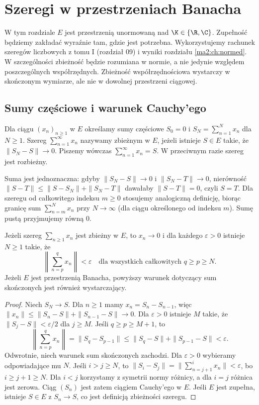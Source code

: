 \chapter{Szeregi w przestrzeniach Banacha}
\label{ma2:ch:banach-series}

W tym rozdziale $E$ jest przestrzenią unormowaną nad
$\K\in\{\R,\C\}$. Zupełność będziemy zakładać wyraźnie tam,
gdzie jest potrzebna. Wykorzystujemy rachunek szeregów liczbowych
z tomu I (rozdział 09) i wyniki rozdziału \ref{ma2:ch:normed}.
W szczególności zbieżność będzie rozumiana w normie, a nie
jedynie względem poszczególnych współrzędnych. Zbieżność
współrzędnościowa wystarczy w skończonym wymiarze, ale nie
w dowolnej przestrzeni ciągowej.

\section{Sumy częściowe i warunek Cauchy'ego}
\begin{definicja}
\label{ma2:def:vector-series}
Dla ciągu $(x_n)_{n\ge1}$ w $E$ określamy sumy częściowe
$S_0=0$ i $S_N=\sum_{n=1}^N x_n$ dla $N\ge1$.
Szereg $\sum_{n=1}^\infty x_n$ nazywamy zbieżnym w $E$,
jeżeli istnieje $S\in E$ takie, że $\|S_N-S\|\to0$.
Piszemy wówczas $\sum_{n=1}^\infty x_n=S$.
W przeciwnym razie szereg jest rozbieżny.
\end{definicja}
Suma jest jednoznaczna: gdyby $\|S_N-S\|\to0$ i
$\|S_N-T\|\to0$, nierówność
$\|S-T\|\le\|S-S_N\|+\|S_N-T\|$ dawałaby $\|S-T\|=0$,
czyli $S=T$. Dla szeregu od całkowitego indeksu $m\ge0$ stosujemy
analogiczną definicję, biorąc granicę sum
$\sum_{n=m}^N x_n$ przy $N\to\infty$ (dla ciągu określonego
od indeksu $m$). Sumę pustą przyjmujemy równą $0$.

\begin{twierdzenie}
\label{ma2:thm:series-cauchy}
Jeżeli szereg $\sum_{n\ge1}x_n$ jest zbieżny w $E$, to
$x_n\to0$ i dla każdego $\varepsilon>0$ istnieje $N\ge1$
takie, że
\[
 \left\|\sum_{n=p}^{q}x_n\right\|<\varepsilon
 \quad\text{dla wszystkich całkowitych }q\ge p\ge N.
\]
Jeżeli $E$ jest przestrzenią Banacha, powyższy warunek
dotyczący sum skończonych jest również wystarczający.
\end{twierdzenie}
\begin{proof}
Niech $S_N\to S$. Dla $n\ge1$ mamy $x_n=S_n-S_{n-1}$,
więc
$\|x_n\|\le\|S_n-S\|+\|S_{n-1}-S\|\to0$.
Dla $\varepsilon>0$ istnieje $M$ takie, że
$\|S_j-S\|<\varepsilon/2$ dla $j\ge M$.
Jeśli $q\ge p\ge M+1$, to
\[
 \left\|\sum_{n=p}^q x_n\right\|=\|S_q-S_{p-1}\|
 \le\|S_q-S\|+\|S_{p-1}-S\|<\varepsilon.
\]
Odwrotnie, niech warunek sum skończonych zachodzi.
Dla $\varepsilon>0$ wybieramy odpowiadające mu $N$.
Jeśli $i>j\ge N$, to
$\|S_i-S_j\|=\|\sum_{n=j+1}^i x_n\|<\varepsilon$,
bo $i\ge j+1\ge N$. Dla $i<j$ korzystamy z symetrii
normy różnicy, a dla $i=j$ różnica jest zerowa.
Ciąg $(S_n)$ jest zatem ciągiem Cauchy'ego w $E$.
Jeśli $E$ jest zupełna, istnieje $S\in E$ z $S_n\to S$,
co jest definicją zbieżności szeregu.
\end{proof}

